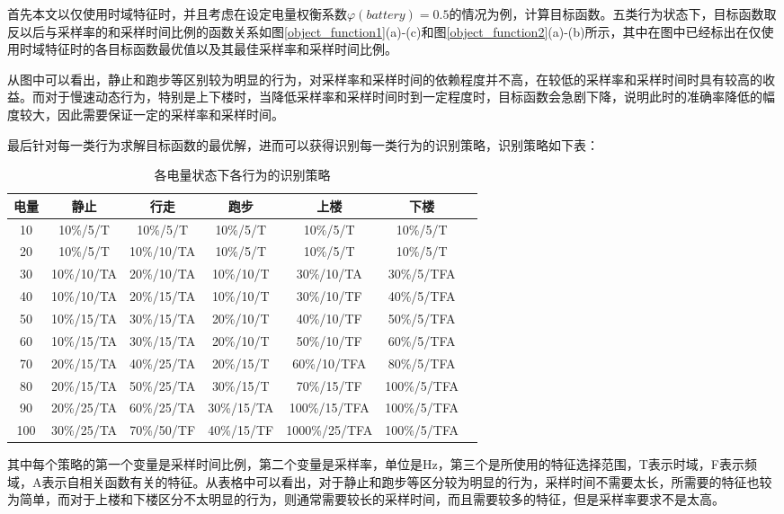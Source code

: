 \par 首先本文以仅使用时域特征时，并且考虑在设定电量权衡系数$\varphi (battery) = 0.5$的情况为例，计算目标函数。五类行为状态下，目标函数取反以后与采样率的和采样时间比例的函数关系如图\ref{object_function1}(a)-(c)和图\ref{object_function2}(a)-(b)所示，其中在图中已经标出在仅使用时域特征时的各目标函数最优值以及其最佳采样率和采样时间比例。
\par 从图中可以看出，静止和跑步等区别较为明显的行为，对采样率和采样时间的依赖程度并不高，在较低的采样率和采样时间时具有较高的收益。而对于慢速动态行为，特别是上下楼时，当降低采样率和采样时间时到一定程度时，目标函数会急剧下降，说明此时的准确率降低的幅度较大，因此需要保证一定的采样率和采样时间。
\par 最后针对每一类行为求解目标函数的最优解，进而可以获得识别每一类行为的识别策略，识别策略如下表：
\begin{table}[htb]
    \centering
    \caption{各电量状态下各行为的识别策略}
    \begin{tabular}{ccccccc}
    \toprule
    电量 & 静止 & 行走 & 跑步 & 上楼 & 下楼 \\
    \midrule
    10 & 10\%/5/T & 10\%/5/T & 10\%/5/T & 10\%/5/T & 10\%/5/T \\
    20 & 10\%/5/T & 10\%/10/TA & 10\%/5/T & 10\%/5/T & 10\%/5/T \\
    30 & 10\%/10/TA & 20\%/10/TA & 10\%/10/T & 30\%/10/TA & 30\%/5/TFA \\
    40 & 10\%/10/TA & 20\%/15/TA & 10\%/10/T & 30\%/10/TF & 40\%/5/TFA \\
    50 & 10\%/15/TA & 30\%/15/TA & 20\%/10/T & 40\%/10/TF & 50\%/5/TFA \\
    60 & 10\%/15/TA & 30\%/15/TA & 20\%/10/T & 50\%/10/TF & 60\%/5/TFA \\
    70 & 20\%/15/TA & 40\%/25/TA & 20\%/15/T & 60\%/10/TFA & 80\%/5/TFA \\
    80 & 20\%/15/TA & 50\%/25/TA & 30\%/15/T & 70\%/15/TF & 100\%/5/TFA \\
    90 & 20\%/25/TA & 60\%/25/TA & 30\%/15/TA & 100\%/15/TFA & 100\%/5/TFA \\
    100 & 30\%/25/TA & 70\%/50/TF & 40\%/15/TF & 1000\%/25/TFA & 100\%/5/TFA \\
    \bottomrule
    \end{tabular}
\end{table}

\par 其中每个策略的第一个变量是采样时间比例，第二个变量是采样率，单位是Hz，第三个是所使用的特征选择范围，T表示时域，F表示频域，A表示自相关函数有关的特征。从表格中可以看出，对于静止和跑步等区分较为明显的行为，采样时间不需要太长，所需要的特征也较为简单，而对于上楼和下楼区分不太明显的行为，则通常需要较长的采样时间，而且需要较多的特征，但是采样率要求不是太高。
